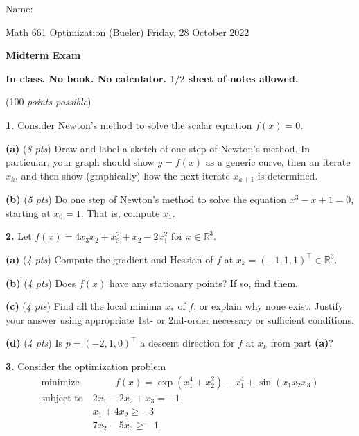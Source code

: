 \documentclass[11pt]{amsart}
\newcommand{\RR}{{\mathbb{R}}}
\newcommand{\prob}[1]{\bigskip\noindent\textbf{#1.} }
\newcommand{\pts}[1]{(\emph{#1 pts})}
\newcommand{\epartpts}[2]{\medskip\noindent \textbf{(#1)} \pts{#2}}
\begin{document}
\hfill \Large Name:\underline{\phantom{Ed Bueler really really long long long name}}
\medskip

\scriptsize \noindent Math 661 Optimization (Bueler) \hfill Friday, 28 October 2022
\medskip

\Large\centerline{\textbf{Midterm Exam}}

\smallskip
\large
\begin{center}
\textbf{In class.  No book.  No calculator.  $1/2$ sheet of notes allowed.}

(100 \emph{points possible})
\end{center}

\medskip
\thispagestyle{empty}


\prob{1}  Consider Newton's method to solve the scalar equation $f(x)=0$.

\epartpts{a}{8}  Draw and label a sketch of one step of Newton's method.  In particular, your graph should show $y=f(x)$ as a generic curve, then an iterate $x_k$, and then show (graphically) how the next iterate $x_{k+1}$ is determined.
\vfill

\epartpts{b}{5}  Do one step of Newton's method to solve the equation $x^3 - x + 1 = 0$, starting at $x_0=1$.  That is, compute $x_1$.
\vspace{2.5in}

\clearpage
\newpage

\prob{2}  Let $f(x) = 4 x_3 x_2 + x_3^2 + x_2 - 2 x_1^2$ for $x\in \RR^3$.

\epartpts{a}{4}   Compute the gradient and Hessian of $f$ at $x_k = (-1,1,1)^\top \in \RR^3$.
\vspace{2.3in}

\epartpts{b}{4}   Does $f(x)$ have any stationary points?  If so, find them.
\vfill

\epartpts{c}{4}   Find all the local minima $x_*$ of $f$, or explain why none exist.  Justify your answer using appropriate 1st- or 2nd-order necessary or sufficient conditions.
\vspace{2.5in}

\epartpts{d}{4}   Is $p = (-2,1,0)^\top$ a descent direction for $f$ at $x_k$ from part \textbf{(a)}?
\vfill


\clearpage\newpage
\prob{3}  Consider the optimization problem
    $$\begin{matrix}
    \text{minimize}\phantom{x} & \phantom{xxxx}f(x) = \exp(x_1^4 + x_2^2) - x_1^4 + \sin(x_1 x_2 x_3)\\
    \text{subject to} & 2 x_1 - 2 x_2 + x_3 = -1 \\
                      & x_1 + 4 x_2 \ge -3 \\
                      & 7 x_2 - 5 x_3 \ge -1
    \end{matrix}$$
\end{document}
